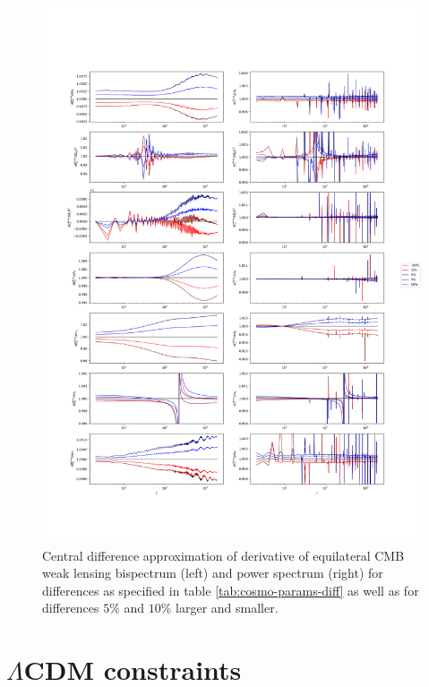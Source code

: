 \documentclass[11pt]{article} %
\begin{document}
\begin{figure}[t]
    \centering
    \includegraphics[height=\textheight]{../code/plots/derivative_accuracy.png}
    \caption{Central difference approximation of derivative of equilateral CMB weak lensing bispectrum (left) and power spectrum (right) for differences as specified in table \ref{tab:cosmo-params-diff} as well as for differences $5\%$ and $10\%$ larger and smaller.}
    \label{fig:deraccuracy}
\end{figure}

\section{$\Lambda$CDM constraints}
\label{sec:lambdacdmconstraints}
\end{document}
